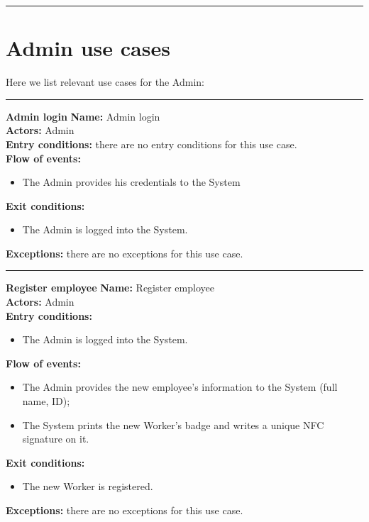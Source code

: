 \begin{center}
\noindent\rule{8cm}{1.0pt}
\end{center}


\section{Admin use cases}
Here we list relevant use cases for the Admin:\\
\begin{center}
\noindent\rule{8cm}{1.0pt}
\end{center}


\textbf{\large Admin login}
\bigbreak
\textbf{Name:} Admin login \\
\textbf{Actors:} Admin \\
\textbf{Entry conditions:} there are no entry conditions for this use case.\\
\textbf{Flow of events:} 
\begin{itemize}
\item The Admin provides his credentials to the System  
\end{itemize}
\textbf{Exit conditions:} 
\begin{itemize}
\item The Admin is logged into the System.
\end{itemize}
\textbf{Exceptions:} there are no exceptions for this use case.\\


\begin{center}
\noindent\rule{8cm}{1.0pt}
\end{center}


\textbf{\large Register employee}
\bigbreak
\textbf{Name:} Register employee \\
\textbf{Actors:} Admin \\
\textbf{Entry conditions:} 
\begin{itemize}
\item The Admin is logged into the System.
\end{itemize}
\textbf{Flow of events:} 
\begin{itemize}
\item The Admin provides the new employee's information to the System (full name, ID);
 \item The System prints the new Worker's badge and writes a unique NFC signature on it.
\end{itemize}
\textbf{Exit conditions:} 
\begin{itemize}
\item The new Worker is registered.
\end{itemize}
\textbf{Exceptions:} there are no exceptions for this use case.\\


